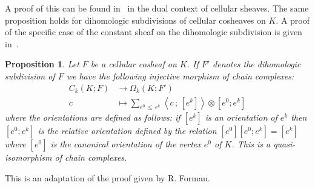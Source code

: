 \documentclass[10pt]{amsart}
\newtheorem{prop}[theo]{Proposition}
\theoremstyle{definition}
\numberwithin{equation}{section}
\numberwithin{figure}{section}
\begin{document}
A proof of this can be found in~\cite[Theorem~1.5.2 p.~31]{She_cel_des}
in the dual context of cellular sheaves. The same proposition holds for dihomologic subdivisions of cellular cosheaves on $K$. A proof of the specific case of the constant sheaf on the dihomologic subdivision is given in~\cite[Theorem~1.2 p.~12]{For_comb_nov}.

\begin{prop}
Let $F$ be a cellular cosheaf on $K$. If $F'$ denotes the dihomologic subdivision of $F$ we have the following injective morphism of chain complexes:
\begin{align*}
C_k(K;F) & \longrightarrow  \Omega_k(K;F') \\
c & \longmapsto  \sum_{e^0\,\leq\,e^k} \left\langle c\,;\,[e^k]\right\rangle\otimes \left[e^0;e^k\right]
\end{align*}
where the orientations are defined as follows: if $[e^k]$ is an orientation of $e^k$ then $[e^0;e^k]$ is the relative orientation defined by the relation $[e^0][e^0;e^k]=[e^k]$ where $[e^0]$ is the canonical orientation of the vertex $e^0$ of $K$. This is a quasi-isomorphism of chain complexes.
\end{prop}

This is an adaptation of the proof given by R. Forman.
\end{document}
